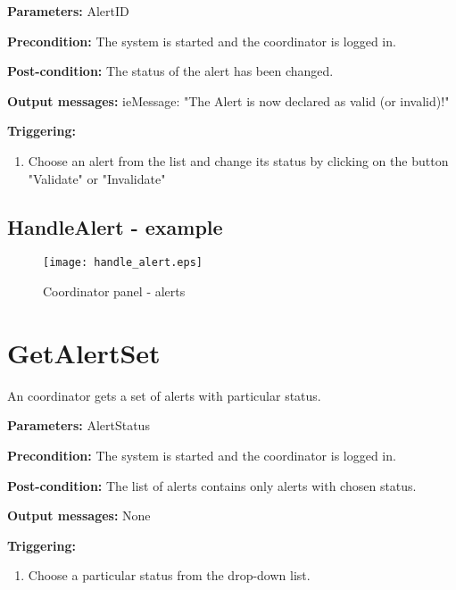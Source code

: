 \begin{description}
	\item \textbf{Parameters:} AlertID 
	\item \textbf{Precondition:} The system is started and the coordinator is
	logged in. 
	\item \textbf{Post-condition:} The status of the alert has been changed.
	\item \textbf{Output messages:} ieMessage: "The Alert is now declared as valid
	(or invalid)!"
	
	\item \textbf{Triggering:}
	
	\begin{enumerate}
		\item Choose an alert from the list and change its status by clicking on the
		button "Validate" or "Invalidate"
	\end{enumerate}
\end{description}

\subsection{HandleAlert - example}

\begin{figure}
    \texttt{[image: handle\_alert.eps]}
	\caption{Coordinator panel - alerts}
\end{figure}




\section{GetAlertSet}
\label{operation:GetAlertSet}

An coordinator gets a set of alerts with particular status.

\begin{description}
	\item \textbf{Parameters:} AlertStatus 
	\item \textbf{Precondition:} The system is started and the coordinator is
	logged in.
	\item \textbf{Post-condition:} The list of alerts contains only alerts with chosen status.
	\item \textbf{Output messages:} None
		
	\item \textbf{Triggering:}
	
	\begin{enumerate}
		\item Choose a particular status from the drop-down list.
	\end{enumerate}
\end{description}



